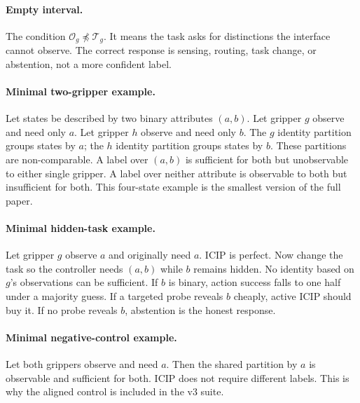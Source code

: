 \documentclass{article}
\newcommand{\icip}{\textsc{ICIP}}
\newcommand{\obs}{\mathcal{O}}
\newcommand{\task}{\mathcal{T}}
\begin{document}
\paragraph{Empty interval.}
The condition $\obs_g\not\preceq\task_g$.
It means the task asks for distinctions the interface cannot observe.
The correct response is sensing, routing, task change, or abstention, not a more confident label.

\paragraph{Minimal two-gripper example.}
Let states be described by two binary attributes $(a,b)$.
Let gripper $g$ observe and need only $a$.
Let gripper $h$ observe and need only $b$.
The $g$ identity partition groups states by $a$; the $h$ identity partition groups states by $b$.
These partitions are non-comparable.
A label over $(a,b)$ is sufficient for both but unobservable to either single gripper.
A label over neither attribute is observable to both but insufficient for both.
This four-state example is the smallest version of the full paper.

\paragraph{Minimal hidden-task example.}
Let gripper $g$ observe $a$ and originally need $a$.
\icip{} is perfect.
Now change the task so the controller needs $(a,b)$ while $b$ remains hidden.
No identity based on $g$'s observations can be sufficient.
If $b$ is binary, action success falls to one half under a majority guess.
If a targeted probe reveals $b$ cheaply, active \icip{} should buy it.
If no probe reveals $b$, abstention is the honest response.

\paragraph{Minimal negative-control example.}
Let both grippers observe and need $a$.
Then the shared partition by $a$ is observable and sufficient for both.
\icip{} does not require different labels.
This is why the aligned control is included in the v3 suite.
\end{document}
